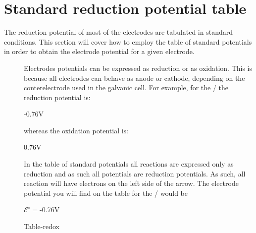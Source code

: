 \documentclass[main.tex]{subfiles}
\begin{document}
\section{Standard reduction potential table}
The reduction potential of most of the electrodes are tabulated in standard conditions. This section will cover how to employ the table of standard potentials in order to obtain the electrode potential for a given electrode.
\sloppy
\begin{description}
\item[] 
Electrodes potentials can be expressed as reduction or as oxidation. This is because all electrodes can behave as anode or cathode, depending on the conterelectrode used in the galvanic cell. For example, for the / the reduction potential is:

\begin{center}\hfill -0.76V\end{center}
whereas the oxidation potential is:
\begin{center}\hfill 0.76V\end{center}
In the table of standard potentials all reactions are expressed only as reduction and as such all potentials are reduction potentials. As such, all reaction will have electrons on the left side of the arrow. The electrode potential you will find on the table for the /  would be
\begin{center}\hfill $\mathcal{E}^{\circ}=$-0.76V\end{center}


{Table-redox}









\end{description}
\end{document}
